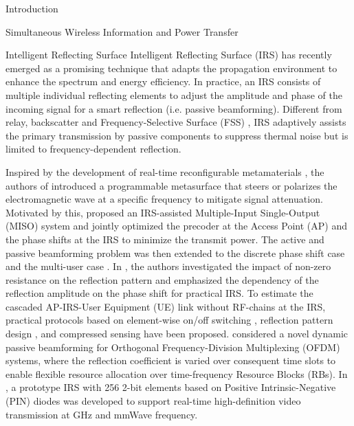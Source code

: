 \documentclass[journal]{IEEEtran}
\begin{document}
\begin{section}{Introduction}
\begin{subsection}{Simultaneous Wireless Information and Power Transfer}
		\end{subsection}


		\begin{subsection}{Intelligent Reflecting Surface}
			Intelligent Reflecting Surface (IRS) has recently emerged as a promising technique that adapts the propagation environment to enhance the spectrum and energy efficiency. In practice, an IRS consists of multiple individual reflecting elements to adjust the amplitude and phase of the incoming signal for a smart reflection (i.e. passive beamforming). Different from relay, backscatter and Frequency-Selective Surface (FSS) \cite{Anwar2018}, IRS adaptively assists the primary transmission by passive components to suppress thermal noise but is limited to frequency-dependent reflection.

			Inspired by the development of real-time reconfigurable metamaterials \cite{Cui2014}, the authors of \cite{Liaskos2018} introduced a programmable metasurface that steers or polarizes the electromagnetic wave at a specific frequency to mitigate signal attenuation. Motivated by this, \cite{Wu2018} proposed an IRS-assisted Multiple-Input Single-Output (MISO) system and jointly optimized the precoder at the Access Point (AP) and the phase shifts at the IRS to minimize the transmit power. The active and passive beamforming problem was then extended to the discrete phase shift case \cite{Wu2019a} and the multi-user case \cite{Wu2019}. In \cite{Abeywickrama2019}, the authors investigated the impact of non-zero resistance on the reflection pattern and emphasized the dependency of the reflection amplitude on the phase shift for practical IRS. To estimate the cascaded AP-IRS-User Equipment (UE) link without RF-chains at the IRS, practical protocols based on element-wise on/off switching \cite{Nadeem2019}, reflection pattern design \cite{You2019,Kang2020}, and compressed sensing \cite{Wang2020} have been proposed. \cite{Yang2020} considered a novel dynamic passive beamforming for Orthogonal Frequency-Division Multiplexing (OFDM) systems, where the reflection coefficient is varied over consequent time slots to enable flexible resource allocation over time-frequency Resource Blocks (RBs). In \cite{Dai2020}, a prototype IRS with \num{256} \num{2}-bit elements based on Positive Intrinsic-Negative (PIN) diodes was developed to support real-time high-definition video transmission at \si{GHz} and mmWave frequency.
		\end{subsection}



\end{section}
\end{document}
